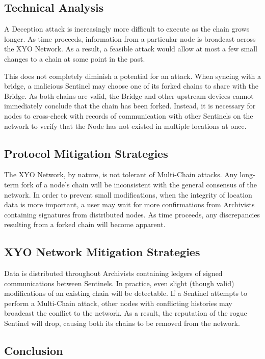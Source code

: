 \documentclass{article}
\begin{document}
\subsection{Technical Analysis}

A Deception attack is increasingly more difficult to execute as the chain grows longer. As time proceeds, information from a particular node is broadcast across the XYO Network. As a result, a feasible attack would allow at most a few small changes to a chain at some point in the past.

This does not completely diminish a potential for an attack. When syncing with a \gls{bridge}, a malicious Sentinel may choose one of its forked chains to share with the Bridge. As both chains are valid, the Bridge and other upstream devices cannot immediately conclude that the chain has been forked. Instead, it is necessary for nodes to cross-check with records of communication with other Sentinels on the network to verify that the Node has not existed in multiple locations at once.

\subsection{Protocol Mitigation Strategies}

The XYO Network, by nature, is not tolerant of Multi-Chain attacks. Any long-term fork of a node's chain will be inconsistent with the general consensus of the network. In order to prevent small modifications, when the integrity of location data is more important, a user may wait for more confirmations from Archivists containing signatures from distributed nodes. As time proceeds, any discrepancies resulting from a forked chain will become apparent.

\subsection{XYO Network Mitigation Strategies}

Data is distributed throughout Archivists containing ledgers of signed communications between Sentinels. In practice, even slight (though valid) modifications of an existing chain will be detectable. If a Sentinel attempts to perform a Multi-Chain attack, other nodes with conflicting histories may broadcast the conflict to the network. As a result, the reputation of the rogue Sentinel will drop, causing both its chains to be removed from the network.

\subsection{Conclusion}
\end{document}
